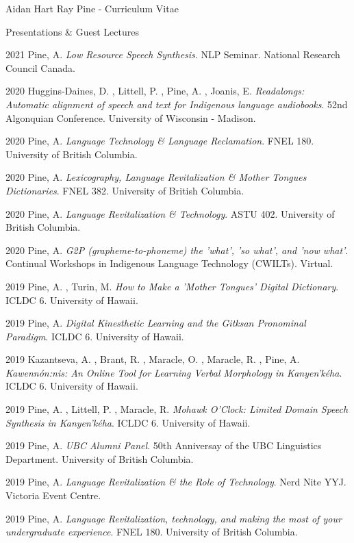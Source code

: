\documentclass[12pt]{letter}
\begin{document}
\begin{cv}{ Aidan Hart Ray Pine  \space - \space   Curriculum Vitae}
\begin{cvlist}{Presentations \& Guest Lectures}
                    \item[2021]  Pine,  A.   \textit{Low Resource Speech Synthesis}. NLP Seminar. National Research Council Canada.  
                    \item[2020]  Huggins-Daines,  D. ,  Littell,  P. ,  Pine,  A. ,  Joanis,  E.   \textit{Readalongs: Automatic alignment of speech and text for Indigenous language audiobooks}. 52nd Algonquian Conference. University of Wisconsin - Madison.  
                    \item[2020]  Pine,  A.   \textit{Language Technology \& Language Reclamation}. FNEL 180. University of British Columbia.  
                    \item[2020]  Pine,  A.   \textit{Lexicography, Language Revitalization \& Mother Tongues Dictionaries}. FNEL 382. University of British Columbia.  
                    \item[2020]  Pine,  A.   \textit{Language Revitalization \& Technology}. ASTU 402. University of British Columbia.  
                    \item[2020]  Pine,  A.   \textit{G2P (grapheme-to-phoneme) the 'what', 'so what', and 'now what'}. Continual Workshops in Indigenous Language Technology (CWILTs). Virtual.  
                    \item[2019]  Pine,  A. ,  Turin,  M.   \textit{How to Make a 'Mother Tongues' Digital Dictionary}. ICLDC 6. University of Hawaii.  
                    \item[2019]  Pine,  A.   \textit{Digital Kinesthetic Learning and the Gitksan Pronominal Paradigm}. ICLDC 6. University of Hawaii.  
                    \item[2019]  Kazantseva,  A. ,  Brant,  R. ,  Maracle,  O. ,  Maracle,  R. ,  Pine,  A.   \textit{Kawenn{\'o}n:nis: An Online Tool for Learning Verbal Morphology in Kanyen'k{\'e}ha}. ICLDC 6. University of Hawaii.  
                    \item[2019]  Pine,  A. ,  Littell,  P. ,  Maracle,  R.   \textit{Mohawk O'Clock: Limited Domain Speech Synthesis in Kanyen'k{\'e}ha}. ICLDC 6. University of Hawaii.  
                    \item[2019]  Pine,  A.   \textit{UBC Alumni Panel}. 50th Anniversay of the UBC Linguistics Department. University of British Columbia.  
                    \item[2019]  Pine,  A.   \textit{Language Revitalization \& the Role of Technology}. Nerd Nite YYJ. Victoria Event Centre.  
                    \item[2019]  Pine,  A.   \textit{Language Revitalization, technology, and making the most of your undergraduate experience}. FNEL 180. University of British Columbia.  

\end{cvlist}
\end{cv}
\end{document}
